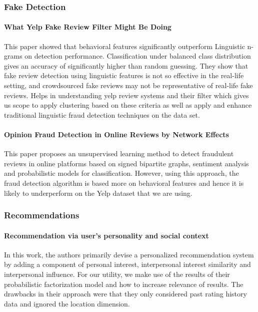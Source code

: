 \documentclass[12pt]{article} %
\begin{document}
\subsubsection{Fake Detection}

\paragraph{What Yelp Fake Review Filter Might Be Doing}
This paper showed that behavioral features significantly outperform Linguistic n-grams on detection performance. Classification under balanced class distribution gives an accuracy of significantly higher than random guessing. They show that fake review detection using linguistic features is not so effective in the real-life setting, and crowdsourced fake reviews may not be representative of real-life fake reviews. Helps in understanding yelp review systems and their filter which gives us scope to apply clustering based on these criteria as well as apply and enhance traditional linguistic fraud detection techniques on the data set. 

\paragraph{Opinion Fraud Detection in Online Reviews by Network Effects} 
This paper proposes an unsupervised learning method to detect fraudulent reviews in online platforms based on signed bipartite graphs, sentiment analysis and probabilistic models for classification. However, using this approach, the fraud detection algorithm is based more on behavioral features and hence it is likely to underperform on the Yelp dataset that we are using.

\subsubsection{Recommendations}

\paragraph{Recommendation via user's personality and social context}
In this work, the authors primarily devise a personalized recommendation system by adding a component of personal interest, interpersonal interest similarity and interpersonal influence. For our utility, we make use of the results of their probabilistic factorization model and how to increase relevance of results. The drawbacks in their approach were that they only considered past rating history data and ignored the location dimension.
\end{document}
